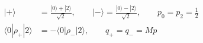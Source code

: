 \documentclass[12pt]{article}
\begin{document}
\fontsize{22}{28}\selectfont
\begin{align*}
|+\rangle &= \frac{|0\rangle+|2\rangle}{\sqrt{2}},
      \qquad
      |-\rangle = \frac{|0\rangle-|2\rangle}{\sqrt{2}},
      \qquad
      p_0=p_2=\tfrac12 \\[0.50em]
\langle 0|\rho_+|2\rangle &= -\langle 0|\rho_-|2\rangle,
      \qquad
      q_+=q_-=Mp
\end{align*}
\end{document}
